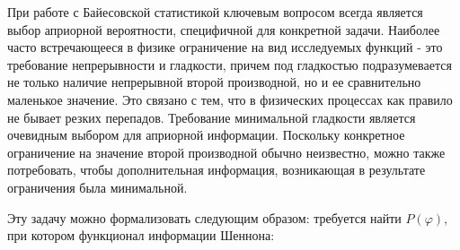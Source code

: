 При работе с Байесовской статистикой ключевым вопросом всегда является выбор априорной вероятности, специфичной для конкретной задачи. Наиболее часто встречающееся в физике ограничение на вид исследуемых функций - это требование непрерывности и гладкости, причем под гладкостью подразумевается не только наличие непрерывной второй производной, но и ее сравнительно маленькое значение. Это связано с тем, что в физических процессах как правило не бывает резких перепадов. Требование минимальной гладкости является очевидным выбором для априорной информации. Поскольку конкретное ограничение на значение второй производной обычно неизвестно, можно также потребовать, чтобы дополнительная информация, возникающая в результате ограничения была минимальной.

Эту задачу можно формализовать следующим образом: требуется найти $P(\varphi)$, при котором функционал информации Шеннона:

